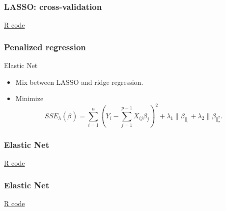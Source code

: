\documentclass[handout]{beamer}
\newcommand{\B}[1]{\beta_{#1}}
\begin{document}


   \begin{frame}
   \frametitle{LASSO: cross-validation}
   \begin{center}
   \end{center}
   \href{http://www.stanford.edu/class/stats191/penalized.html#lasso}{R code}
   \end{frame}


   \begin{frame} \frametitle{Penalized regression}

   \begin{block}
    {Elastic Net}
        \begin{itemize}
        \item Mix between LASSO and ridge regression.

        \item Minimize
    $$
    SSE_{\lambda}(\B{}) = \sum_{i=1}^n \left(Y_i - \sum_{j=1}^{p-1} X_{ij} \B{j}\right)^2 + \lambda_1 \|\B\|_1 + \lambda_2 \|\B\|_2^2.$$

        \end{itemize}

   \end{block}
   \end{frame}



   \begin{frame}
   \frametitle{Elastic Net}
   \begin{center}
   \end{center}
   \href{http://www.stanford.edu/class/stats191/penalized.html#lasso}{R code}
   \end{frame}



   \begin{frame}
   \frametitle{Elastic Net}
   \begin{center}
   \end{center}
   \href{http://www.stanford.edu/class/stats191/penalized.html#lasso}{R code}
   \end{frame}


   \begin{frame} 

   \end{frame}

   
\end{document}
